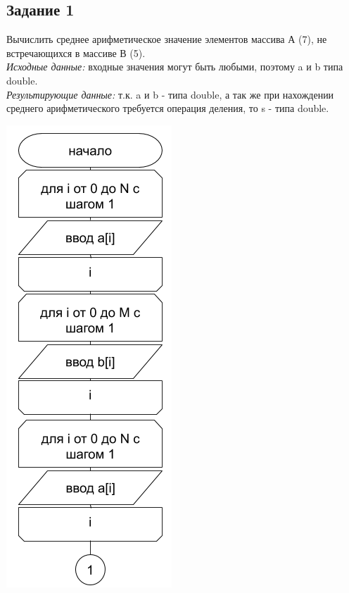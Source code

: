 \documentclass[a4paper,14pt]{extarticle}
\begin{document}
\subsection{Задание 1}
Вычислить среднее арифметическое значение элементов массива А (7), не встречающихся в массиве В (5).\\
\textit{Исходные данные:} входные значения могут быть любыми, поэтому a и b типа double.\\
\textit{Результирующие данные:} т.к. a и b - типа double, а так же при нахождении среднего арифметического требуется операция деления, то s - типа double.
\begin{center}
\includegraphics[scale=0.6]{lab4-1-1.png}\\

\end{center}
\end{document}
